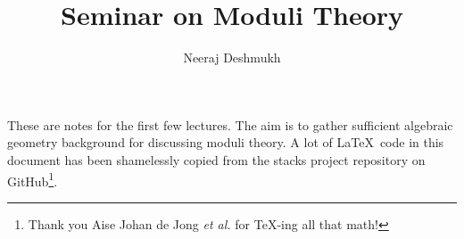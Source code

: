 \documentclass[11pt]{amsart}
\makeatletter
\def\subtitle#1{\gdef\@subtitle{#1}}
\def\@subtitle{}
\newcommand{\sO}{{\mathcal O}}
\renewcommand{\P}{{\mathbb P}}
\theoremstyle{definition}
\makeatother
\begin{document}
\title{Seminar on Moduli Theory}
\subtitle{\today}
\author{Neeraj Deshmukh}

\maketitle


These are notes for the first few lectures. The aim is to gather sufficient algebraic geometry background for discussing moduli theory. A lot of \LaTeX\, code in this document has been shamelessly copied from the stacks project repository on GitHub\footnote{Thank you Aise Johan de Jong \textit{et al.} for TeX-ing all that math!}.

\begin{comment}
\section{Plan}

One way to go to through these sessions is go recall theory of schemes (at level of things in Hartshorne chapter two), by doing a beeline through all the definitions, properties, etc. However, I feel since the point of doing this exercise is to become more comfortable in working with scheme, we will just do lots of examples instead. By this, I mean we will just to prove some things in very concrete situations. This will help you build a concrete picture of the generalities.

List of some things to discuss (just do lots of examples):

\begin{enumerate}
	\item Definition of a scheme.
	\item Say affine communication lemma \textit{stress this!}
	\item examples
	\begin{enumerate}
		\item $\P^n$ and it sheaf theory! This already clarifies the $\sO(n)$'s
	\end{enumerate}
\end{enumerate}



\end{comment}
\end{document}
